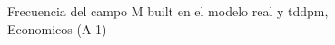 \begin{figure}[H]
    \centering
    
    \caption{Frecuencia del campo M built en el modelo real y tddpm, Economicos (A-1)}
    \label{frecuency-M Built-tddpm_mlp}
\end{figure}